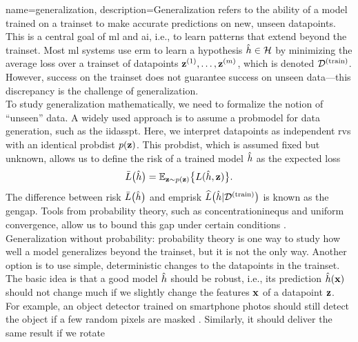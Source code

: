 {name={generalization}, 
	description={Generalization refers to the ability of a \gls{model} trained on a \gls{trainset} to make accurate 
		\glspl{prediction} on new, unseen \glspl{datapoint}. This is a central goal of \gls{ml} and \gls{ai}, i.e., 
		to learn patterns that extend beyond the \gls{trainset}. Most \gls{ml} systems 
		use \gls{erm} to learn a \gls{hypothesis} $\hat{h} \in \mathcal{H}$ by minimizing 
		the average \gls{loss} over a \gls{trainset} of \glspl{datapoint} ${\bf z}^{(1)}, \ldots, {\bf z}^{(m)}$, 
		which is denoted $\mathcal{D}^{(\rm train)}$. However, success on the \gls{trainset} does not guarantee success on 
		unseen \gls{data}—this discrepancy is the challenge of generalization. \\ To study generalization 
		mathematically, we need to formalize the notion of ``unseen'' \gls{data}. A widely used 
		approach is to assume a \gls{probmodel} for \gls{data} generation, such as the \gls{iidasspt}. 
		Here, we interpret \glspl{datapoint} as independent \glspl{rv} with an identical 
		\gls{probdist} $p({\bf z})$. This \gls{probdist}, which is assumed fixed but unknown, 
		allows us to define the \gls{risk} of a trained \gls{model} $\hat{h}$ as the expected \gls{loss}
		\[
		\bar{L} \big( \hat{h} \big)=\mathbb{E}_{{\bf z} \sim p({\bf z})} \big\{ L(\hat{h}, {\bf z}) \big\}.
		\]
		The difference between \gls{risk} $\bar{L} \big( \hat{h} \big)$ and \gls{emprisk} $\widehat{L}\big(\hat{h}|\mathcal{D}^{(\rm train)}\big)$ 
		is known as the \gls{gengap}. Tools from \gls{probability} theory, such as \glspl{concentrationinequ} 
		and uniform convergence, allow us to bound this gap under certain conditions \cite{ShalevMLBook}.\\
		Generalization without \gls{probability}: \Gls{probability} theory is one way to study how well a 
		\gls{model} generalizes beyond the \gls{trainset}, but it is not the only way. Another option is to use 
		simple, deterministic changes to the \glspl{datapoint} in the \gls{trainset}. The basic idea is that a 
		good \gls{model} $\hat{h}$ should be robust, i.e., its \gls{prediction} $\hat{h}({\bf x})$ 
		should not change much if we slightly change the \glspl{feature} ${\bf x}$ of a \gls{datapoint} ${\bf z}$. 
		\\[1mm] For example, an object detector trained on smartphone photos should still detect the object if a few 
		random pixels are masked \cite{OnePixelAttack}. Similarly, it should deliver the same result if we rotate 
}}
